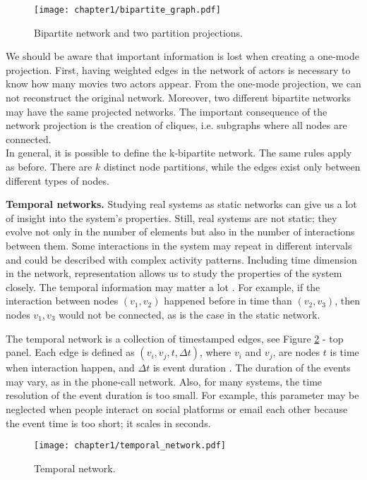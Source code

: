 \begin{figure}[h]
	\centering
	\texttt{[image: chapter1/bipartite\_graph.pdf]} 
	\caption[Bipartite network.]{Bipartite network and two partition projections.}
	\label{fig:bipartite}
\end{figure}

We should be aware that important information is lost when creating a one-mode projection. First, having weighted edges in the network of actors is necessary to know how many movies two actors appear. From the one-mode projection, we can not reconstruct the original network. Moreover, two different bipartite networks may have the same projected networks. The important consequence of the network projection is the creation of cliques, i.e. subgraphs where all nodes are connected. \\
In general, it is possible to define the k-bipartite network. The same rules apply as before. There are $k$ distinct node partitions, while the edges exist only between different types of nodes.

\textbf{Temporal networks.}
Studying real systems as static networks can give us a lot of insight into the system's properties. Still, real systems are not static; they evolve not only in the number of elements but also in the number of interactions between them. Some interactions in the system may repeat in different intervals and could be described with complex activity patterns. Including time dimension in the network, representation allows us to study the properties of the system closely. The temporal information may matter a lot \cite{holme2012}. For example, if the interaction between nodes $(v_1, v_2)$ happened before in time than  $(v_2, v_3)$, then nodes $v_1, v_3$ would not be connected, as is the case in the static network. 

The temporal network is a collection of timestamped edges, see Figure \ref{fig:temporal} - top panel. Each edge is defined as $(v_i, v_j, t, \Delta t)$, where $v_i$ and $v_j$, are nodes $t$ is time when interaction happen, and $\Delta t$ is event duration \cite{guide_temporal}. The duration of the events may vary, as in the phone-call network. Also, for many systems, the time resolution of the event duration is too small. For example, this parameter may be neglected when people interact on social platforms or email each other because the event time is too short; it scales in seconds.

\begin{figure}[h]
	\centering
	\texttt{[image: chapter1/temporal\_network.pdf]} 
	\caption[Temporal network.]{Temporal network. }
	\label{fig:temporal}
\end{figure}

